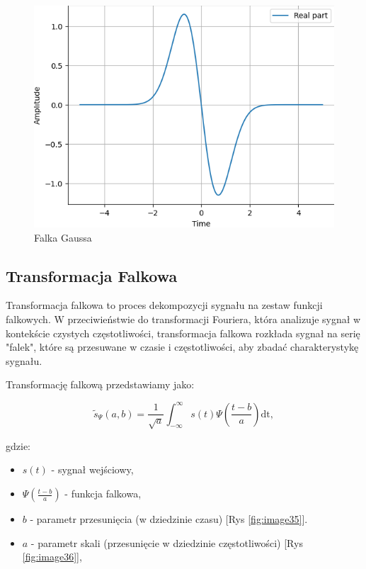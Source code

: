 \begin{figure}[ht]
    \begin{minipage}[t]{0.3\linewidth}
        \includegraphics[width=\linewidth]{Rozdziały/02.Podstawy_teoretyczne/Obrazy/wavelet_gaus1.png}
        \caption{Falka Gaussa}
        \label{fig:image33}
    \end{minipage}
\end{figure}


\subsection*{Transformacja Falkowa}

Transformacja falkowa to proces dekompozycji sygnału na zestaw funkcji falkowych. W przeciwieństwie do transformacji Fouriera, która analizuje sygnał w kontekście czystych częstotliwości, transformacja falkowa rozkłada sygnał na serię "falek", które są przesuwane w czasie i częstotliwości, aby zbadać charakterystykę sygnału.


Transformację falkową przedstawiamy jako:

\begin{equation}
    \tilde{s}_{\Psi}(a, b)=\frac{1}{\sqrt{a}} \int_{-\infty}^{\infty} s(t) \Psi\left(\frac{t-b}{a}\right) \mathrm{dt},
\end{equation}

gdzie:
\begin{itemize}
    \item $s(t)$ - sygnał wejściowy,
    \item $\Psi\left(\frac{t-b}{a}\right)$ - funkcja falkowa,
    \item $b$ - parametr przesunięcia (w dziedzinie czasu) [Rys \ref{fig:image35}].
    \item $a$ - parametr skali (przesunięcie w dziedzinie częstotliwości) [Rys \ref{fig:image36}],
\end{itemize}


